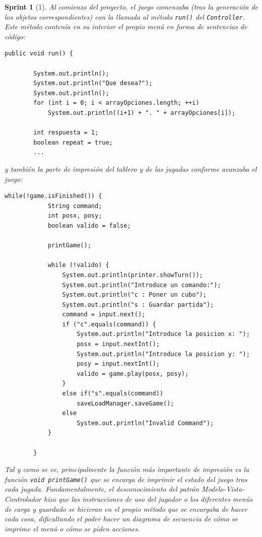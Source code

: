 \documentclass{article}
\theoremstyle{break}
\newtheorem*{sprint}{Sprint}
\begin{document}
\begin{sprint}[1]
Al comienzo del proyecto, el juego comenzaba (tras la generación de los objetos correspondientes) con la llamada al método \texttt{run()} del \texttt{Controller}. Este método contenía en su interior el propio menú en forma de sentencias de código:
\begin{lstlisting}
public void run() {

		System.out.println();
		System.out.println("Que desea?");
		System.out.println();
		for (int i = 0; i < arrayOpciones.length; ++i)
			System.out.println((i+1) + ". " + arrayOpciones[i]);
		
		int respuesta = 1;
		boolean repeat = true;
		...
\end{lstlisting}
y también la parte de impresión del tablero y de las jugadas conforme avanzaba el juego:
\begin{lstlisting}
while(!game.isFinished()) {
			String command;
			int posx, posy;
			boolean valido = false;
			
			printGame();
			
			while (!valido) {
				System.out.println(printer.showTurn());
				System.out.println("Introduce un comando:");
				System.out.println("c : Poner un cubo");
				System.out.println("s : Guardar partida");
				command = input.next();
				if ("c".equals(command)) {
					System.out.println("Introduce la posicion x: ");
					posx = input.nextInt();
					System.out.println("Introduce la posicion y: ");
					posy = input.nextInt();
					valido = game.play(posx, posy);
				}					
				else if("s".equals(command))
					saveLoadManager.saveGame();
				else
					System.out.println("Invalid Command");										
			}
			
		}
\end{lstlisting}
Tal y como se ve, principalmente la función más importante de impresión es la función \texttt{void printGame()} que se encarga de imprimir el estado del juego tras cada jugada. Fundamentalmente, el desconocimiento del patrón Modelo-Vista-Controlador hizo que las instrucciones de uso del jugador o los diferentes menús de carga y guardado se hicieran en el propio método que se encargaba de hacer cada cosa, dificultando el poder hacer un diagrama de secuencia de cómo se imprime el menú o cómo se piden acciones.
\end{sprint}
\end{document}
